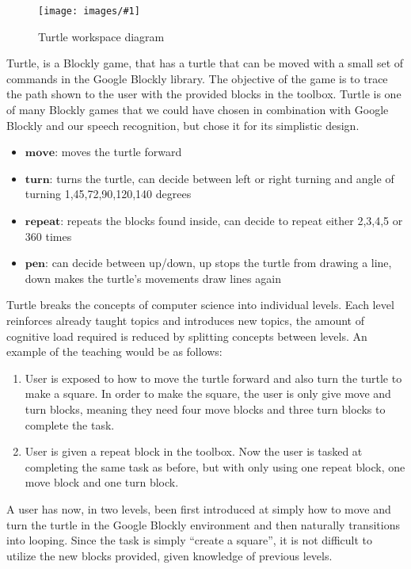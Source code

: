 \documentclass[]{article}
\newcommand\fig[3]{
\begin{figure}
  \begin{center}
  \texttt{[image: images/\#1]}
  \caption{#2} 
  \label{fig:#1}
  \end{center}
\end{figure}
}
\begin{document}
\fig{turtle_workspace.jpg}{Turtle workspace diagram}{width=4cm}

Turtle, is a Blockly game, that has a turtle that can be moved with a small
set of commands in the Google Blockly library. The objective of the game is to trace the path shown to the
user with the provided blocks in the toolbox. Turtle is one of many Blockly games
that we could have chosen in combination with Google Blockly and our speech recognition,
but chose it for its simplistic design.

\begin{itemize}
  \item $\textbf{move}$: moves the turtle forward
  \item $\textbf{turn}$: turns the turtle, can decide between left or right turning and angle of turning  1,45,72,90,120,140 degrees
  \item $\textbf{repeat}$: repeats the blocks found inside, can decide to repeat either 2,3,4,5 or 360 times
  \item $\textbf{pen}$: can decide between up/down, up stops the turtle from drawing a line, down makes the turtle's movements draw lines again
\end{itemize}
Turtle breaks the concepts of computer science into individual
levels. Each level reinforces already taught topics and introduces new topics, the amount of cognitive load
required is reduced by splitting concepts between levels. An example of the teaching would be as follows:
\begin{enumerate}
  \item User is exposed to how to move the turtle forward and also turn the turtle to make a square. In order to make the square, the user
    is only give move and turn blocks, meaning they need four move blocks and three turn blocks to complete the task.
  \item User is given a repeat block in the toolbox. Now the user is tasked at completing the same task as before, but with only using one repeat
    block, one move block and one turn block.
\end{enumerate}
A user has now, in two levels, been first introduced at simply how to move and turn the turtle in the Google Blockly environment and then
naturally transitions into looping. Since the task is simply ``create a square'', it is not difficult to utilize the new blocks provided,
given knowledge of previous levels.
\end{document}
